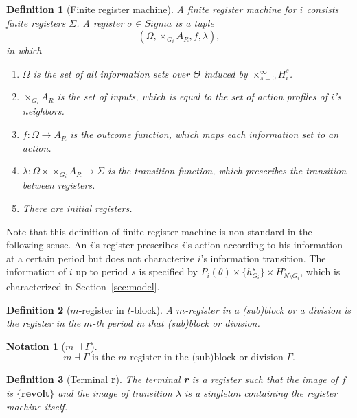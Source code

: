 \documentclass[12pt,letter]{article}
\newtheorem{definition}{Definition}[section]
\newtheorem{notation}{Notation}[section]
\theoremstyle{definition}
\theoremstyle{remark}
\theoremstyle{claim}
\begin{document}
\begin{definition}[Finite register machine]
A finite register machine for $i$ consists finite registers $\Sigma$. A register $\sigma\in Sigma$ is a tuple \[(\Omega, \times_{G_i}A_R,f,\lambda),\] in which 
\begin{enumerate}
\item $\Omega$ is the set of all information sets over $\Theta$ induced by $\times^{\infty}_{s=0}H^s_i$. 
\item $\times_{G_i}A_R$ is the set of inputs, which is equal to the set of action profiles of $i$'s neighbors.
\item $f:\Omega\rightarrow A_{R}$ is the outcome function, which maps each information set to an action.
\item $\lambda: \Omega\times \times_{G_i}A_R \rightarrow \Sigma$ is the transition function, which prescribes the transition between registers.
\item There are initial registers. 
\end{enumerate}
\end{definition}

Note that this definition of finite register machine is non-standard in the following sense. An $i$'s register prescribes $i$'s action according to his information at a certain period but does not characterize $i$'s information transition. The information of $i$ up to period $s$ is specified by $P_i(\theta)\times \{h^s_{G_i}\}\times H^s_{N\setminus G_i}$, which is characterized in Section~\ref{sec:model}. 

\begin{definition}[$m$-register in $t$-block]
A $m$-register in a (sub)block or a division is the register in the $m$-th period in that (sub)block or division. 
\end{definition}

\begin{notation}[$m\dashv\Gamma$]
\[\text{$m\dashv\Gamma$ is the $m$-register in the (sub)block or division $\Gamma$.}\]
\end{notation}

\begin{definition}[Terminal \textbf{r}]
The terminal \textbf{r} is a register such that the image of $f$ is $\{\textbf{revolt}\}$ and the image of transition $\lambda$ is a singleton containing the register machine itself. 
\end{definition}
\end{document}
